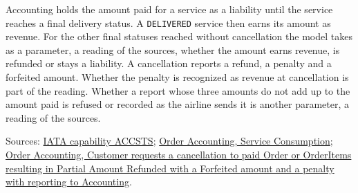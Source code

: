 \begin{definition}
  \label{def:accounting-books}
  Accounting holds the amount paid for a service as a liability until the
  service reaches a final delivery status.  A \texttt{DELIVERED} service then
  earns its amount as revenue.  For the other final statuses reached
  without cancellation the model takes as a parameter, a reading of the
  sources, whether the amount earns revenue, is refunded or stays a
  liability.  A cancellation reports a refund, a penalty and a forfeited
  amount.  Whether the penalty is recognized as revenue at cancellation is
  part of the reading.  Whether a report whose three amounts do not add up
  to the amount paid is refused or recorded as the airline sends it is
  another parameter, a reading of the sources.

  Sources: \href{https://retailing.iata.org/armi/docs/ACCSTS/}{IATA capability ACCSTS};
  \href{https://standards.atlassian.net/wiki/spaces/OA/pages/579272705}{Order Accounting, Service Consumption};
  \href{https://standards.atlassian.net/wiki/spaces/OA/pages/844333143}{Order Accounting, Customer requests a cancellation to paid Order or OrderItems resulting in Partial Amount Refunded with a Forfeited amount and a penalty with reporting to Accounting}.
\end{definition}

